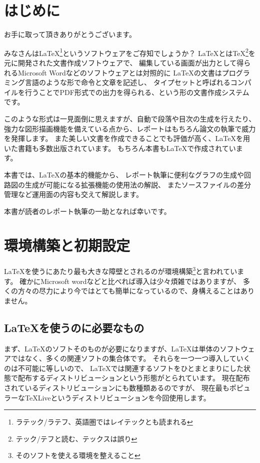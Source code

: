 \documentclass[uplatex,b5j]{jsbook}
\begin{document}
\tableofcontents
\clearpage

\chapter{はじめに}
	お手に取って頂きありがとうございます。

	みなさんは\LaTeX \footnote{ラテック/ラテフ、英語圏ではレイテックとも読まれる}というソフトウェアをご存知でしょうか？
	\LaTeX とは\TeX \footnote{テック/テフと読む、テックスは誤り}を元に開発された文書作成ソフトウェアで、
	編集している画面が出力として得られるMicrosoft Wordなどのソフトウェアとは対照的に
	\LaTeX の文書はプログラミング言語のような形で命令と文章を記述し、
	タイプセットと呼ばれるコンパイルを行うことでPDF形式での出力を得られる、という形の文書作成システムです。

	このような形式は一見面倒に思えますが、自動で段落や目次の生成を行えたり、
	強力な図形描画機能を備えている点から、レポートはもちろん論文の執筆で威力を発揮します。
	また美しい文書を作成できることでも評価が高く、\LaTeX を用いた書籍も多数出版されています。
	もちろん本書も\LaTeX で作成されています。

	本書では、\LaTeX の基本的機能から、
	レポート執筆に便利なグラフの生成や回路図の生成が可能になる拡張機能の使用法の解説、
	またソースファイルの差分管理など運用面の内容も交えて解説します。

	本書が読者のレポート執筆の一助となれば幸いです。

\chapter{環境構築と初期設定}
	\LaTeX を使うにあたり最も大きな障壁とされるのが環境構築\footnote{そのソフトを使える環境を整えること}と言われています。
	確かにMicrosoft wordなどと比べれば導入は少々煩雑ではありますが、
	多くの方々の尽力により今ではとても簡単になっているので、身構えることはありません。

	\section{\LaTeX を使うのに必要なもの}
		まず、\LaTeX のソフトそのものが必要になりますが、\LaTeX は単体のソフトウェアではなく、多くの関連ソフトの集合体です。
		それらを一つ一つ導入していくのは不可能に等しいので、
		\LaTeX では関連するソフトをひとまとまりにした状態で配布するディストリビューションという形態がとられています。
		現在配布されているディストリビューションにも数種類あるのですが、
		現在最もポピュラーな\TeX Liveというディストリビューションを今回使用します。
\end{document}
